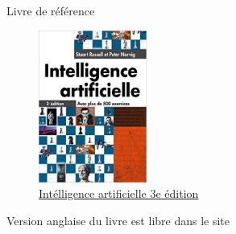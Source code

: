 \documentclass{beamer}
\begin{document}
\begin{frame}[t]{Livre de référence}
  \begin{figure}[htpb]
    \centering
    \includegraphics[width=0.3\linewidth,height=5cm]{./images/book_cover.jpg}
    \caption*{ \href{https://www.amazon.fr/dp/2744074551/ref=pe_3044141_189395771_TE_3p_dp_1}{Intélligence artificielle 3e édition} }
    \label{fig:./images/book_cover}
  \end{figure} 

\small Version anglaise du livre est \alert{libre} dans le site
{\scriptsize
{}}
\end{frame}
\end{document}
